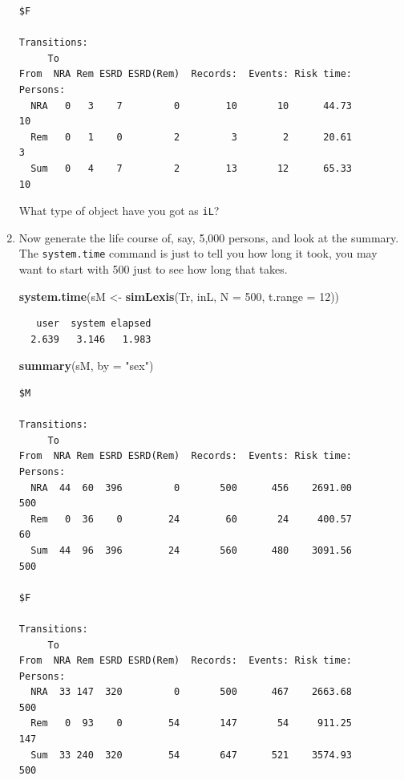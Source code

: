 \documentclass[
]{book}
\newenvironment{Shaded}{\begin{snugshade}}{\end{snugshade}}
\newcommand{\AttributeTok}[1]{\textcolor[rgb]{0.13,0.29,0.53}{#1}}
\newcommand{\DecValTok}[1]{\textcolor[rgb]{0.00,0.00,0.81}{#1}}
\newcommand{\FunctionTok}[1]{\textcolor[rgb]{0.13,0.29,0.53}{\textbf{#1}}}
\newcommand{\NormalTok}[1]{#1}
\newcommand{\OtherTok}[1]{\textcolor[rgb]{0.56,0.35,0.01}{#1}}
\newcommand{\StringTok}[1]{\textcolor[rgb]{0.31,0.60,0.02}{#1}}
\begin{document}
\begin{enumerate}
\begin{verbatim}
$F

Transitions:
     To
From  NRA Rem ESRD ESRD(Rem)  Records:  Events: Risk time:  Persons:
  NRA   0   3    7         0        10       10      44.73        10
  Rem   0   1    0         2         3        2      20.61         3
  Sum   0   4    7         2        13       12      65.33        10
\end{verbatim}

  What type of object have you got as \texttt{iL}?
\item
  Now generate the life course of, say, 5,000 persons, and look at the summary.
  The \texttt{system.time} command is just to tell you how long it
  took, you may want to start with 500 just to see how long that takes.

\begin{Shaded}
\begin{Highlighting}[]
\FunctionTok{system.time}\NormalTok{(sM }\OtherTok{\textless{}{-}} \FunctionTok{simLexis}\NormalTok{(Tr, inL, }\AttributeTok{N =} \DecValTok{500}\NormalTok{, }\AttributeTok{t.range =} \DecValTok{12}\NormalTok{))}
\end{Highlighting}
\end{Shaded}

\begin{verbatim}
   user  system elapsed 
  2.639   3.146   1.983 
\end{verbatim}

\begin{Shaded}
\begin{Highlighting}[]
\FunctionTok{summary}\NormalTok{(sM, }\AttributeTok{by =} \StringTok{"sex"}\NormalTok{)}
\end{Highlighting}
\end{Shaded}

\begin{verbatim}
$M

Transitions:
     To
From  NRA Rem ESRD ESRD(Rem)  Records:  Events: Risk time:  Persons:
  NRA  44  60  396         0       500      456    2691.00       500
  Rem   0  36    0        24        60       24     400.57        60
  Sum  44  96  396        24       560      480    3091.56       500

$F

Transitions:
     To
From  NRA Rem ESRD ESRD(Rem)  Records:  Events: Risk time:  Persons:
  NRA  33 147  320         0       500      467    2663.68       500
  Rem   0  93    0        54       147       54     911.25       147
  Sum  33 240  320        54       647      521    3574.93       500
\end{verbatim}


\end{enumerate}
\end{document}
